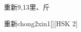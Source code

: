 \begin{entry}{重新}{9,13}{⾥、⽄}
  \begin{phonetics}{重新}{chong2xin1}[][HSK 2]
  \end{phonetics}
\end{entry}

